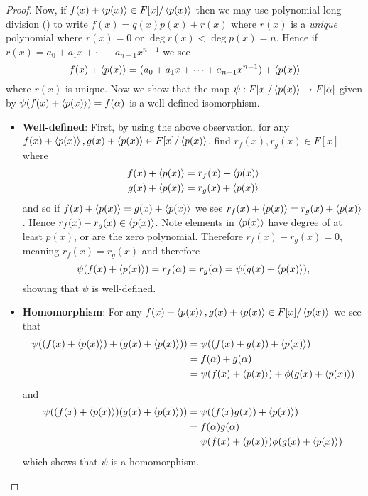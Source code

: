 \begin{proof}
    Now, if $f(x) + \left\langle p(x)\right\rangle \in F[x]/\left\langle p(x)\right\rangle$ then we may use polynomial long division () to write $f(x) = q(x)p(x) + r(x)$ where $r(x)$ is a \textit{unique} polynomial where $r(x) = 0$ or $\deg r(x) < \deg p(x) = n$. Hence if $r(x) = a_0 + a_1x + \cdots + a_{n-1}x^{n-1}$ we see
    \[
        f(x) + \left\langle p(x)\right\rangle = (a_0 + a_1x + \cdots + a_{n-1}x^{n-1}) + \left\langle p(x)\right\rangle
    \]
    where $r(x)$ is unique. Now we show that the map $\psi: F[x]/\left\langle p(x)\right\rangle \to F[\alpha]$ given by $\psi(f(x) + \left\langle p(x)\right\rangle) = f(\alpha)$ is a well-defined isomorphism.
    \begin{itemize}
        \item \textbf{Well-defined}: First, by using the above observation, for any $f(x) + \left\langle p(x)\right\rangle, g(x) + \left\langle p(x)\right\rangle \in F[x]/\left\langle p(x)\right\rangle$, find $r_f(x), r_g(x) \in F[x]$ where
        \begin{align*}
            f(x) + \left\langle p(x)\right\rangle &= r_f(x) + \left\langle p(x)\right\rangle\\
            g(x) + \left\langle p(x)\right\rangle &= r_g(x) + \left\langle p(x)\right\rangle
        \end{align*}
        and so if $f(x) + \left\langle p(x)\right\rangle = g(x) + \left\langle p(x)\right\rangle$ we see $r_f(x) + \left\langle p(x)\right\rangle = r_g(x) + \left\langle p(x)\right\rangle$. Hence $r_f(x) - r_g(x) \in \left\langle p(x)\right\rangle$. Note elements in $\left\langle p(x)\right\rangle$ have degree of at least $p(x)$, or are the zero polynomial. Therefore $r_f(x) - r_g(x) = 0$, meaning $r_f(x) = r_g(x)$ and therefore
        \[
            \psi(f(x) + \left\langle p(x)\right\rangle) = r_f(\alpha) = r_g(\alpha) = \psi(g(x) + \left\langle p(x)\right\rangle),
        \]
        showing that $\psi$ is well-defined.

        \item \textbf{Homomorphism}: For any $f(x) + \left\langle p(x)\right\rangle, g(x) + \left\langle p(x)\right\rangle \in F[x]/\left\langle p(x)\right\rangle$ we see that
        \begin{align*}
            \psi((f(x) + \left\langle p(x)\right\rangle) + (g(x) + \left\langle p(x)\right\rangle)) &= \psi((f(x) + g(x)) + \left\langle p(x)\right\rangle)\\
            &= f(\alpha) + g(\alpha)\\
            &= \psi(f(x) + \left\langle p(x)\right\rangle) + \phi(g(x) + \left\langle p(x)\right\rangle)
        \end{align*}
        and
        \begin{align*}
            \psi((f(x) + \left\langle p(x)\right\rangle)(g(x) + \left\langle p(x)\right\rangle)) &= \psi((f(x)g(x)) + \left\langle p(x)\right\rangle)\\
            &= f(\alpha)g(\alpha)\\
            &= \psi(f(x) + \left\langle p(x)\right\rangle)\phi(g(x) + \left\langle p(x)\right\rangle)
        \end{align*}
        which shows that $\psi$ is a homomorphism.


\end{itemize}
\end{proof}

